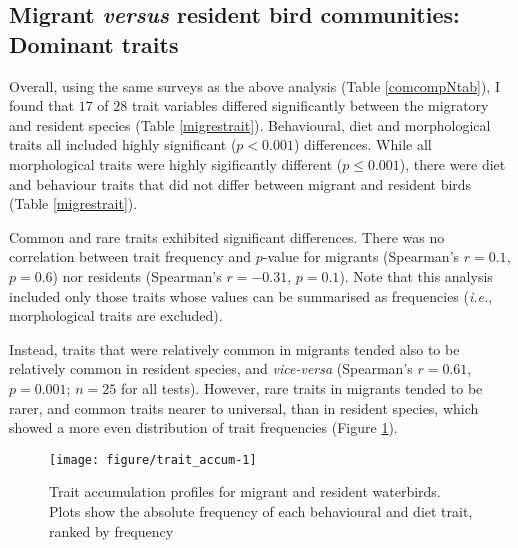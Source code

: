 \documentclass[12pt,a4paper]{article}\usepackage[]{graphicx}\usepackage[]{color}
\newenvironment{knitrout}{}{} %
\begin{document}
\clearpage
\subsection{Migrant \emph{versus} resident bird communities: Dominant traits}

Overall, using the same surveys as the above analysis (Table \ref{comcompNtab}), I found that $17$ of $28$ trait variables differed significantly between the migratory and resident species (Table \ref{migrestrait}). Behavioural, diet and morphological traits all included highly significant ($p < 0.001$) differences. While all morphological traits were highly sigificantly different ($p \leq 0.001$), there were diet and behaviour traits that did not differ between migrant and resident birds (Table \ref{migrestrait}). 



Common and rare traits exhibited significant differences. There was no correlation between trait frequency and $p$-value for migrants (Spearman's $r = 0.1$, $p = 0.6$) nor residents (Spearman's $r = \ensuremath{-0.31}$, $p = 0.1$). Note that this analysis included only those traits whose values can be summarised as frequencies (\emph{i.e.}, morphological traits are excluded). 

Instead, traits that were relatively common in migrants tended also to be relatively common in resident species, and \emph{vice-versa} (Spearman's $r = 0.61$, $p = 0.001$; $n=25$ for all tests). However, rare traits in migrants tended to be rarer, and common traits nearer to universal, than in resident species, which showed a more even distribution of trait frequencies (Figure \ref{fig:trait_accum}).

\begin{knitrout}
\color{fgcolor}\begin{figure}[bt]

{\centering \texttt{[image: figure/trait\_accum-1]} 

}

\caption[Trait accumulation profiles for migrant and resident waterbirds]{Trait accumulation profiles for migrant and resident waterbirds. Plots show the absolute frequency of each behavioural and diet trait, ranked by frequency}\label{fig:trait_accum}
\end{figure}


\end{knitrout}
\end{document}
